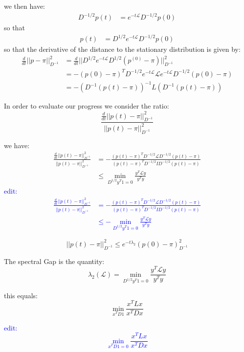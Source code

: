 \documentclass[11pt]{article}
\begin{document}
we then have:
\begin{align*}
    D^{-1/2}p(t) &= e^{-t \mathcal{L}}D^{-1/2} p(0)    
\end{align*}
so that
\begin{align*}
    p(t) &= D^{1/2}e^{-t\mathcal{L}}D^{-1/2}p(0)
\end{align*}
so that the derivative of the distance to the stationary distribution is given by:
\begin{align*}
    \frac{d}{dt}||p - \pi ||^2_{D^{-1}} &= \frac{d}{dt} ||D^{1/2} e^{-t\mathcal{L}}D^{1/2} (p^{(0)} - \pi) ||^2_{D^{-1}}\\
    &= -(p(0) - \pi)^T D^{-1/2}e^{-t\mathcal{L}}\mathcal{L}e^{-t\mathcal{L}}D^{-1/2}(p(0) - \pi)\\
    &= -(D^{-1}(p(t) - \pi))^{-1}L(D^{-1}(p(t) - \pi))
\end{align*}

In order to evaluate our progress we consider the ratio:
\[
    \frac{\frac{d}{dt}||p(t) - \pi||^2_{D^{-1}}}{||p(t) - \pi||^2_{D^{-1}}}
\]

we have:
\begin{align*}
    \frac{\frac{d}{dt}||p(t) - \pi||^2_{D^{-1}}}{||p(t) - \pi||^2_{D^{-1}}} &= - \frac{(p(t) - \pi)^TD^{-1/2} \mathcal{L} D^{-1/2}(p(t) - \pi)}{(p(t) - \pi)^TD^{-1/2}I D^{-1/2}(p(t) - \pi)}\\
    &\leq \underset{D^{1/2}y^T1 =0}{\min}\frac{y^T\mathcal{L} y}{y^Ty}
\end{align*}
\textcolor{blue}{edit:
\begin{align*}
    \frac{\frac{d}{dt}||p(t) - \pi||^2_{D^{-1}}}{||p(t) - \pi||^2_{D^{-1}}} &= - \frac{(p(t) - \pi)^TD^{-1/2} \mathcal{L} D^{-1/2}(p(t) - \pi)}{(p(t) - \pi)^TD^{-1/2}I D^{-1/2}(p(t) - \pi)}\\
    &\leq - \underset{D^{1/2}y^T1 =0}{\min}\frac{y^T\mathcal{L} y}{y^Ty}
\end{align*}
}


\begin{theorem}
\[
    ||p(t) - \pi||^2_{D^{-1}} \leq e^{-t\lambda_2}(p(0) - \pi)^2_{D^{-1}}
\]
\end{theorem}

\begin{definition}
The spectral Gap is the quantity:
\[
\lambda_2(\mathcal{L}) = \underset{D^{1/2}y^T1 =0}{\min}\frac{y^T\mathcal{L} y}{y^Ty} 
\]

this equals:
\[
    \underset{x^TD1}{\min} \frac{x^TLx}{x^TDx}
\]
\end{definition}
\textcolor{blue}{edit: 
\[
    \underset{x^TD1=0}{\min} \frac{x^TLx}{x^TDx}
\]}
\end{document}
